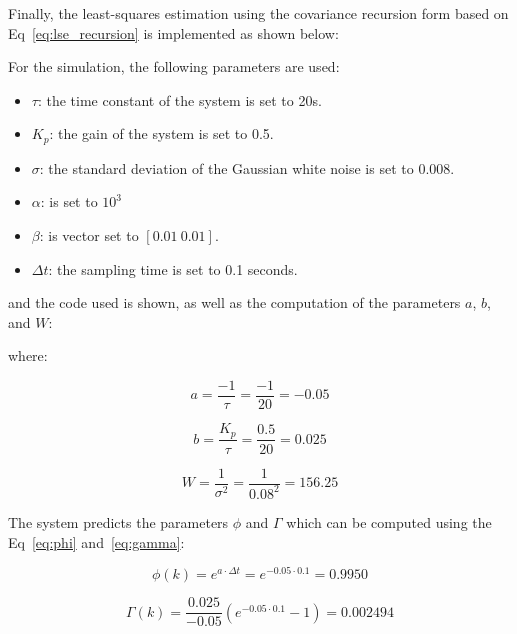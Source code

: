 

Finally, the least-squares estimation using the covariance recursion form based on Eq~\ref{eq:lse_recursion} is implemented as shown below:



For the simulation, the following parameters are used:

\begin{itemize}
    \item $\tau$: the time constant of the system is set to 20s.

    \item $K_{p}$: the gain of the system is set to 0.5.

    \item $\sigma$: the standard deviation of the Gaussian white noise is set to 0.008.

    \item $\alpha$: is set to $10^{3}$

    \item $\beta$: is vector set to $\left[ 0.01 ~ 0.01 \right]$.

    \item $\Delta t$: the sampling time is set to 0.1 seconds.
\end{itemize}

and the code used is shown, as well as the computation of the parameters $a$, $b$, and $W$:



where:

\begin{equation}
    a = \frac{-1}{\tau} = \frac{-1}{20} = -0.05
\end{equation}

\begin{equation}
    b = \frac{K_{p}}{\tau} = \frac{0.5}{20} = 0.025
\end{equation}

\begin{equation}
    W = \frac{1}{\sigma^{2}} = \frac{1}{0.08^{2}} = 156.25
\end{equation}

The system predicts the parameters $\phi$ and $\Gamma$ which can be computed using the Eq~\ref{eq:phi} and~\ref{eq:gamma}:

\begin{equation}
    \phi(k) = e^{a \cdot \Delta t} = e^{-0.05 \cdot 0.1} = 0.9950
\end{equation}

\begin{equation}
    \Gamma(k) = \frac{0.025}{-0.05} \left( e^{-0.05 \cdot 0.1} - 1\right) = 0.002494
\end{equation}

